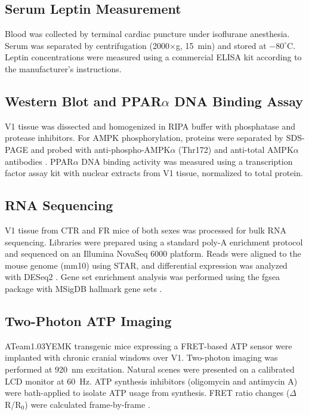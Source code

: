 \documentclass[11pt]{article}
\begin{document}
\subsection{Serum Leptin Measurement}

Blood was collected by terminal cardiac puncture under isoflurane anesthesia. Serum was separated by centrifugation (2000$\times$g, 15~min) and stored at $-80^{\circ}$C. Leptin concentrations were measured using a commercial ELISA kit according to the manufacturer's instructions.

\subsection{Western Blot and PPAR$\alpha$ DNA Binding Assay}

V1 tissue was dissected and homogenized in RIPA buffer with phosphatase and protease inhibitors. For AMPK phosphorylation, proteins were separated by SDS-PAGE and probed with anti-phospho-AMPK$\alpha$ (Thr172) and anti-total AMPK$\alpha$ antibodies \citep{western_blot_methods2014}. PPAR$\alpha$ DNA binding activity was measured using a transcription factor assay kit with nuclear extracts from V1 tissue, normalized to total protein.

\subsection{RNA Sequencing}

V1 tissue from CTR and FR mice of both sexes was processed for bulk RNA sequencing. Libraries were prepared using a standard poly-A enrichment protocol and sequenced on an Illumina NovaSeq 6000 platform. Reads were aligned to the mouse genome (mm10) using STAR, and differential expression was analyzed with DESeq2 \citep{deseq2_love2014}. Gene set enrichment analysis was performed using the fgsea package with MSigDB hallmark gene sets \citep{go_enrichment2009}.

\subsection{Two-Photon ATP Imaging}

ATeam1.03YEMK transgenic mice expressing a FRET-based ATP sensor \citep{ateam_sensor2009} were implanted with chronic cranial windows over V1. Two-photon imaging was performed at 920~nm excitation. Natural scenes were presented on a calibrated LCD monitor at 60~Hz. ATP synthesis inhibitors (oligomycin and antimycin A) were bath-applied to isolate ATP usage from synthesis. FRET ratio changes ($\Delta$R/R$_0$) were calculated frame-by-frame \citep{twophoton_imaging2005}.
\end{document}
